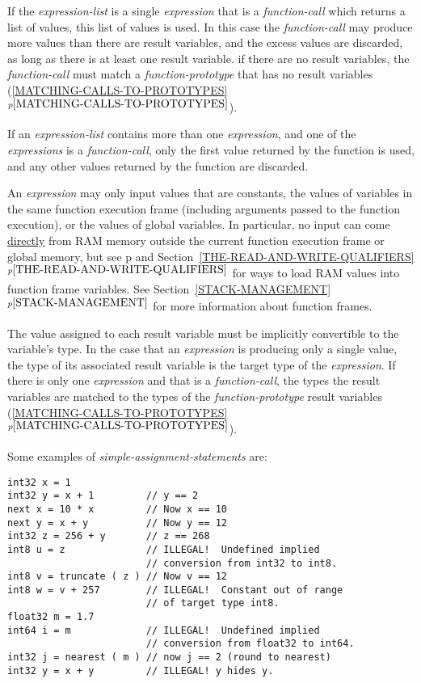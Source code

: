 \documentclass[12pt]{article}
\newcommand{\itemref}[1]{\ref{#1}$^{p\pageref{#1}}$}
\newcommand{\pagref}[1]{p\pageref{#1}}
\newenvironment{indpar}[1][0.3in]%
	{\begin{list}{}%
		     {\setlength{\itemsep}{0in}%
		      \setlength{\topsep}{0in}%
		      \setlength{\parsep}{1ex}%
		      \setlength{\labelwidth}{#1}%
		      \setlength{\leftmargin}{#1}%
		      \addtolength{\leftmargin}{\labelsep}}%
	 \item}%
	{\end{list}}
\begin{document}
If the {\em expression-list} is a single {\em expression} that
is a {\em function-call} which
returns a list of values, this list of values is used.
In this case the {\em function-call} may produce more values than
there are result variables, and the excess values are discarded,
as long as there is at least one result variable.
if there are no result variables, the
{\em function-call} must match a {\em function-prototype} that has
no result variables (\itemref{MATCHING-CALLS-TO-PROTOTYPES}).

If an {\em expression-list} contains more than one {\em expression},
and one of the {\em expressions} is a {\em function-call}, only the
first value returned by the function is used, and any other values
returned by the function are discarded.

An {\em expression} may only input values that are constants,
the values of variables in the same function execution
frame (including arguments passed to the function execution), 
or the values of global variables.  In particular,
no input can come \underline{directly}
from RAM memory outside the current function execution frame or
global memory,
but see \pagref{READ} and Section~\itemref{THE-READ-AND-WRITE-QUALIFIERS}
for ways to load RAM values into function frame variables.
See Section~\itemref{STACK-MANAGEMENT} for more information about
function frames.

The value assigned to each result variable must be implicitly convertible to
the variable's type.
In the case that an {\em expression} is producing
only a single value, the type of its associated result variable is the target
type of the {\em expression}.  If there is only one {\em expression}
and that is a {\em function-call}, the types the result variables
are matched to the types of the {\em function-prototype} result
variables (\itemref{MATCHING-CALLS-TO-PROTOTYPES}).

Some examples of {\em simple-assignment-statements} are:
\begin{indpar}\begin{verbatim}
int32 x = 1
int32 y = x + 1         // y == 2
next x = 10 * x         // Now x == 10
next y = x + y          // Now y == 12
int32 z = 256 + y       // z == 268
int8 u = z              // ILLEGAL!  Undefined implied
                        // conversion from int32 to int8.
int8 v = truncate ( z ) // Now v == 12
int8 w = v + 257        // ILLEGAL!  Constant out of range
                        // of target type int8.
float32 m = 1.7
int64 i = m             // ILLEGAL!  Undefined implied
                        // conversion from float32 to int64.
int32 j = nearest ( m ) // now j == 2 (round to nearest)
int32 y = x + y         // ILLEGAL! y hides y.
\end{verbatim}\end{indpar}
\end{document}
